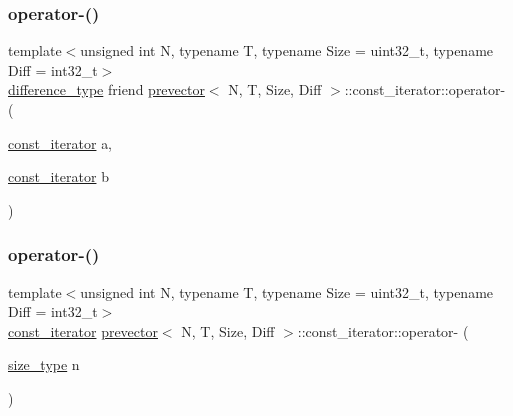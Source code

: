\subsubsection{\texorpdfstring{operator-\/()}{operator-()}\hspace{0.1cm}{\footnotesize\ttfamily [1/2]}}
{\footnotesize\ttfamily template$<$unsigned int N, typename T, typename Size = uint32\+\_\+t, typename Diff = int32\+\_\+t$>$ \\
\mbox{\hyperlink{classprevector_1_1const__iterator_a8c3d9b22578d2b87f14513d523b151e9}{difference\+\_\+type}} friend \mbox{\hyperlink{classprevector}{prevector}}$<$ N, T, Size, Diff $>$\+::const\+\_\+iterator\+::operator-\/ (\begin{DoxyParamCaption}\item[{\mbox{\hyperlink{classprevector_1_1const__iterator}{const\+\_\+iterator}}}]{a,  }\item[{\mbox{\hyperlink{classprevector_1_1const__iterator}{const\+\_\+iterator}}}]{b }\end{DoxyParamCaption})\hspace{0.3cm}{\ttfamily [inline]}}

\mbox{\label{classprevector_1_1const__iterator_ab053b2e3b60b800249ae81c0e3cb6583}} 
\subsubsection{\texorpdfstring{operator-\/()}{operator-()}\hspace{0.1cm}{\footnotesize\ttfamily [2/2]}}
{\footnotesize\ttfamily template$<$unsigned int N, typename T, typename Size = uint32\+\_\+t, typename Diff = int32\+\_\+t$>$ \\
\mbox{\hyperlink{classprevector_1_1const__iterator}{const\+\_\+iterator}} \mbox{\hyperlink{classprevector}{prevector}}$<$ N, T, Size, Diff $>$\+::const\+\_\+iterator\+::operator-\/ (\begin{DoxyParamCaption}\item[{\mbox{\hyperlink{classprevector_a7e0da95e6d1c878f6eeb572f4fc12524}{size\+\_\+type}}}]{n }\end{DoxyParamCaption})\hspace{0.3cm}{\ttfamily [inline]}}

\mbox{\label{classprevector_1_1const__iterator_a5809a0ea5a3536795de20e617247d060}} 

